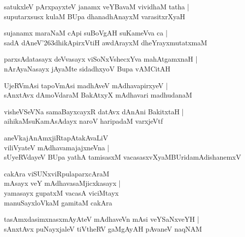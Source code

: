 \documentclass[twoside,12pt,openright]{book}
\def\S{\char'263}
\newcounter{shloka}[chapter]
\begin{document}
\begin{shloka}%
satukxleV pArxpayxteV janamx veYBavaM vividhaM tatha |\\
suputarxsusx kulaM BUpa dhanadhAnayxM varasitxrXyaH 
\end{shloka}

\begin{shloka}%
sujanamx maraNaM cApi suBoVgAH suKameVva ca |\\
sadA dAneV\S dhikApirxVtiH awdArayxM dheYrayxmutatxmaM 
\end{shloka}

\begin{shloka}%
parxsAdatasayx deVvasayx viSoNxVshecxYva mahAtgamxnaH |\\
nArAyaNasayx jAyaMte sidadhxyoV Bupa vAMCitAH 
\end{shloka}

\begin{shloka}%
UjeRVmAsi tapoVmAsi madhAveV mAdhavapirxyeV |\\
sAnxtAvx dAmoVdaraM BakAtxyX mAdhavari madhudanaM 
\end{shloka}

\begin{shloka}%
visheVSeVNa samaBayxcayxR datAvx dAnAni BakitxtaH |\\
aihikaMsuKamAsAdayx naroV haripadaM varxjeVtf
\end{shloka}

\begin{shloka}%
aneVkajAnAmxjiRtapAtakAvaLiV \\
viliVyateV mAdhavamajajxneVna |\\
sUyeRVdayeV BUpa yathA tamisasxM 
vacasasxvXyaMBUridamAdishanemxV\\
\end{shloka}

\begin{shloka}%
cakAra viSUNxviRpulaparxcAraM \\
mAsayx veY mAdhavasaMjicxkasayx |\\
yamasayx gupatxM vacasA viciMtayx \\
manuSayxloVkaM gamitaM cakAra
\end{shloka}

\begin{shloka}%
tasAmxdasimxnasxmAyAteV mAdhaveVn mAsi veYSaNxveYH |\\
sAnxtAvx puNayxjaleV tiVtheRV gaMgAyAH pAvaneV naqNAM 
\end{shloka}
\end{document}
